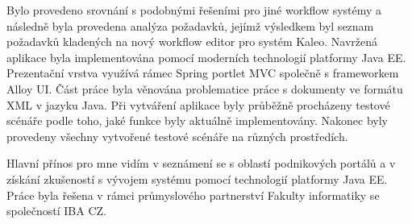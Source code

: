 \documentclass{fithesis}
\begin{document}
Bylo provedeno srovnání s podobnými řešeními pro jiné workflow systémy a následně byla provedena analýza požadavků, jejímž výsledkem byl seznam požadavků kladených na nový workflow editor pro systém Kaleo. Navržená aplikace byla implementována pomocí moderních technologií platformy Java EE. Prezentační vrstva využívá rámec Spring portlet MVC společně s frameworkem Alloy UI. Část práce byla věnována problematice práce s dokumenty ve formátu XML v jazyku Java. Při vytváření aplikace byly průběžně procházeny testové scénáře podle toho, jaké funkce byly aktuálně implementovány. Nakonec byly provedeny všechny vytvořené testové scénáře na různých prostředích.

Hlavní přínos pro mne vidím v seznámení se s oblastí podnikových portálů a v získání zkušeností s vývojem systému pomocí technologií platformy Java EE. Práce byla řešena v rámci průmyslového partnerství Fakulty informatiky se společností IBA CZ.




\printindex
\end{document}

